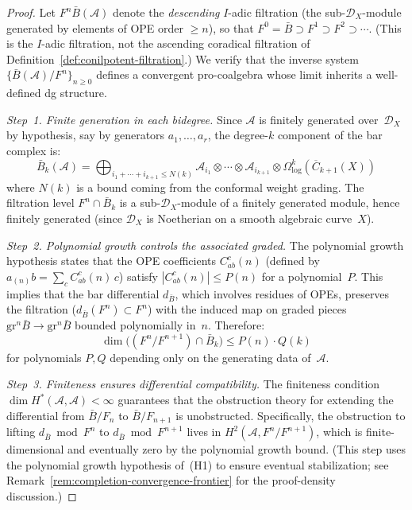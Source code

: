 \begin{proof}
Let $F^n \bar{B}(\mathcal{A})$ denote the \emph{descending} $I$-adic filtration (the sub-$\mathcal{D}_X$-module generated by elements of OPE order $\geq n$), so that $F^0 = \bar{B} \supset F^1 \supset F^2 \supset \cdots$.  (This is the $I$-adic filtration, not the ascending coradical filtration of Definition~\ref{def:conilpotent-filtration}.)  We verify that the inverse system $\{\bar{B}(\mathcal{A})/F^n\}_{n \geq 0}$ defines a convergent pro-coalgebra whose limit inherits a well-defined dg structure.

\emph{Step~1. Finite generation in each bidegree.}
Since $\mathcal{A}$ is finitely generated over~$\mathcal{D}_X$ by hypothesis, say by generators $a_1, \ldots, a_r$, the degree-$k$ component of the bar complex is:
\[
\bar{B}_k(\mathcal{A}) = \bigoplus_{i_1 + \cdots + i_{k+1} \leq N(k)} \mathcal{A}_{i_1} \otimes \cdots \otimes \mathcal{A}_{i_{k+1}} \otimes \Omega^k_{\log}(\overline{C}_{k+1}(X))
\]
where $N(k)$ is a bound coming from the conformal weight grading.  The filtration level $F^n \cap \bar{B}_k$ is a sub-$\mathcal{D}_X$-module of a finitely generated module, hence finitely generated (since $\mathcal{D}_X$ is Noetherian on a smooth algebraic curve~$X$).

\emph{Step~2. Polynomial growth controls the associated graded.}
The polynomial growth hypothesis states that the OPE coefficients $C^c_{ab}(n)$ (defined by $a_{(n)}b = \sum_c C^c_{ab}(n)\, c$) satisfy $|C^c_{ab}(n)| \leq P(n)$ for a polynomial~$P$.  This implies that the bar differential $d_{\bar{B}}$, which involves residues of OPEs, preserves the filtration ($d_{\bar{B}}(F^n) \subset F^n$) with the induced map on graded pieces $\mathrm{gr}^n \bar{B} \to \mathrm{gr}^n \bar{B}$ bounded polynomially in~$n$.  Therefore:
\[
\dim\bigl((F^n/F^{n+1}) \cap \bar{B}_k\bigr) \leq P(n) \cdot Q(k)
\]
for polynomials $P, Q$ depending only on the generating data of~$\mathcal{A}$.

\emph{Step~3. Finiteness ensures differential compatibility.}
The finiteness condition $\dim H^*(\mathcal{A}, \mathcal{A}) < \infty$ guarantees that the obstruction theory for extending the differential from $\bar{B}/F_n$ to $\bar{B}/F_{n+1}$ is unobstructed.  Specifically, the obstruction to lifting $d_{\bar{B}} \bmod F^n$ to $d_{\bar{B}} \bmod F^{n+1}$ lives in $H^2(\mathcal{A}, F^n/F^{n+1})$, which is finite-dimensional and eventually zero by the polynomial growth bound.  (This step uses the polynomial growth hypothesis of~(H1) to ensure eventual stabilization; see Remark~\ref{rem:completion-convergence-frontier} for the proof-density discussion.)


\end{proof}
